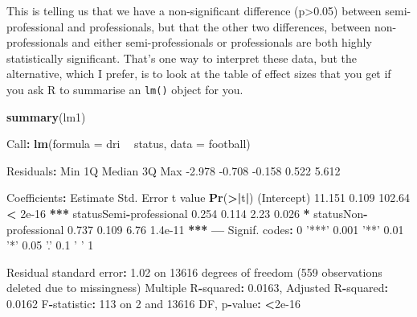 \documentclass[
]{book}
\newenvironment{Shaded}{\begin{snugshade}}{\end{snugshade}}
\newcommand{\DataTypeTok}[1]{\textcolor[rgb]{0.13,0.29,0.53}{#1}}
\newcommand{\DecValTok}[1]{\textcolor[rgb]{0.00,0.00,0.81}{#1}}
\newcommand{\ErrorTok}[1]{\textcolor[rgb]{0.64,0.00,0.00}{\textbf{#1}}}
\newcommand{\FloatTok}[1]{\textcolor[rgb]{0.00,0.00,0.81}{#1}}
\newcommand{\KeywordTok}[1]{\textcolor[rgb]{0.13,0.29,0.53}{\textbf{#1}}}
\newcommand{\NormalTok}[1]{#1}
\newcommand{\OperatorTok}[1]{\textcolor[rgb]{0.81,0.36,0.00}{\textbf{#1}}}
\newcommand{\StringTok}[1]{\textcolor[rgb]{0.31,0.60,0.02}{#1}}
\begin{document}
This is telling us that we have a non-significant difference (p\textgreater0.05) between semi-professional and professionals, but that the other two differences, between non-professionals and either semi-professionals or professionals are both highly statistically significant. That's one way to interpret these data, but the alternative, which I prefer, is to look at the table of effect sizes that you get if you ask R to summarise an \texttt{lm()} object for you.

\begin{Shaded}
\begin{Highlighting}[]
\KeywordTok{summary}\NormalTok{(lm1)}

\NormalTok{Call}\OperatorTok{:}
\KeywordTok{lm}\NormalTok{(}\DataTypeTok{formula =}\NormalTok{ dri }\OperatorTok{~}\StringTok{ }\NormalTok{status, }\DataTypeTok{data =}\NormalTok{ football)}

\NormalTok{Residuals}\OperatorTok{:}
\StringTok{   }\NormalTok{Min     1Q Median     3Q    Max }
\FloatTok{-2.978} \FloatTok{-0.708} \FloatTok{-0.158}  \FloatTok{0.522}  \FloatTok{5.612} 

\NormalTok{Coefficients}\OperatorTok{:}
\StringTok{                        }\NormalTok{Estimate Std. Error t value }\KeywordTok{Pr}\NormalTok{(}\OperatorTok{>}\ErrorTok{|}\NormalTok{t}\OperatorTok{|}\NormalTok{)    }
\NormalTok{(Intercept)               }\FloatTok{11.151}      \FloatTok{0.109}  \FloatTok{102.64}  \OperatorTok{<}\StringTok{ }\FloatTok{2e-16} \OperatorTok{**}\ErrorTok{*}
\NormalTok{statusSemi}\OperatorTok{-}\NormalTok{professional    }\FloatTok{0.254}      \FloatTok{0.114}    \FloatTok{2.23}    \FloatTok{0.026} \OperatorTok{*}\StringTok{  }
\NormalTok{statusNon}\OperatorTok{-}\NormalTok{professional     }\FloatTok{0.737}      \FloatTok{0.109}    \FloatTok{6.76}  \FloatTok{1.4e-11} \OperatorTok{**}\ErrorTok{*}
\OperatorTok{---}
\NormalTok{Signif. codes}\OperatorTok{:}\StringTok{  }\DecValTok{0} \StringTok{'***'} \FloatTok{0.001} \StringTok{'**'} \FloatTok{0.01} \StringTok{'*'} \FloatTok{0.05} \StringTok{'.'} \FloatTok{0.1} \StringTok{' '} \DecValTok{1}

\NormalTok{Residual standard error}\OperatorTok{:}\StringTok{ }\FloatTok{1.02}\NormalTok{ on }\DecValTok{13616}\NormalTok{ degrees of freedom}
\NormalTok{  (}\DecValTok{559}\NormalTok{ observations deleted due to missingness)}
\NormalTok{Multiple R}\OperatorTok{-}\NormalTok{squared}\OperatorTok{:}\StringTok{  }\FloatTok{0.0163}\NormalTok{,    Adjusted R}\OperatorTok{-}\NormalTok{squared}\OperatorTok{:}\StringTok{  }\FloatTok{0.0162} 
\NormalTok{F}\OperatorTok{-}\NormalTok{statistic}\OperatorTok{:}\StringTok{  }\DecValTok{113}\NormalTok{ on }\DecValTok{2}\NormalTok{ and }\DecValTok{13616}\NormalTok{ DF,  p}\OperatorTok{-}\NormalTok{value}\OperatorTok{:}\StringTok{ }\ErrorTok{<}\FloatTok{2e-16}
\end{Highlighting}
\end{Shaded}
\end{document}

